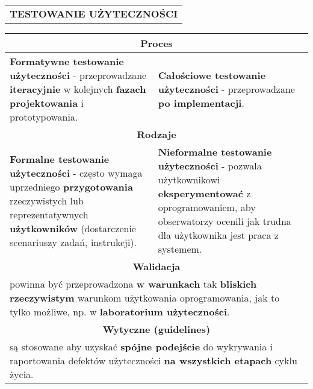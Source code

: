 \documentclass[../main.tex]{subfiles}
\begin{document}
    \begin{table}[H]
        \begin{center}
            \begin{tabular}{| p{8cm} | p{8cm} |}
                \multicolumn{2}{c}{\textbf{TESTOWANIE UŻYTECZNOŚCI}}\\
            \end{tabular}
        \end{center}
    \end{table}
    \begin{table}[H]
        \begin{center}
            \begin{tabular}{| p{8cm} | p{8cm} |}
                \hline
                \multicolumn{2}{|c|}{\textbf{Proces}}\\
                \hline
                \textbf{Formatywne testowanie użyteczności} - przeprowadzane \textbf{iteracyjnie} w
                kolejnych \textbf{fazach projektowania} i prototypowania.
                &
                \textbf{Całościowe testowanie użyteczności} - przeprowadzane \textbf{po implementacji}.
                \\
                \hline
                \hline
                \multicolumn{2}{|c|}{\textbf{Rodzaje}}\\
                \hline
                \textbf{Formalne testowanie użyteczności} - często wymaga uprzedniego \textbf{przygotowania} rzeczywistych
                lub reprezentatywnych \textbf{użytkowników} (dostarczenie scenariuszy zadań, instrukcji).
                &
                \textbf{Nieformalne testowanie użyteczności} - pozwala użytkownikowi \textbf{eksperymentować} z
                oprogramowaniem, aby obserwatorzy ocenili jak trudna dla użytkownika jest praca z systemem.\\
                \hline
                \hline
                \multicolumn{2}{|c|}{\textbf{Walidacja}}\\
                \hline
                \multicolumn{2}{|p{16,5cm}|}{powinna być przeprowadzona \textbf{w warunkach} tak \textbf{bliskich rzeczywistym} warunkom użytkowania
                oprogramowania, jak to tylko możliwe, np. w \textbf{laboratorium użyteczności}.}\\
                \hline
                \hline
                \multicolumn{2}{|c|}{\textbf{Wytyczne (guidelines)}}\\
                \hline
                \multicolumn{2}{|p{16,5cm}|}{są stosowane aby uzyskać \textbf{spójne podejście} do wykrywania i raportowania defektów
                użyteczności \textbf{na wszystkich etapach} cyklu życia.}\\
                \hline
            \end{tabular}
        \end{center}
    \end{table}
\end{document}
